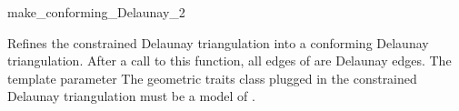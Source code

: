 \begin{ccRefFunction}{make_conforming_Delaunay_2}


{ Refines the constrained Delaunay triangulation  into a
  conforming Delaunay triangulation. After a call to this function,
  all edges of  are Delaunay edges.   
  \ccPrecond The template parameter  \meshcdtrequires{}
  The geometric traits class plugged in the constrained Delaunay
  triangulation must be a model of
  .} 

\end{ccRefFunction}

